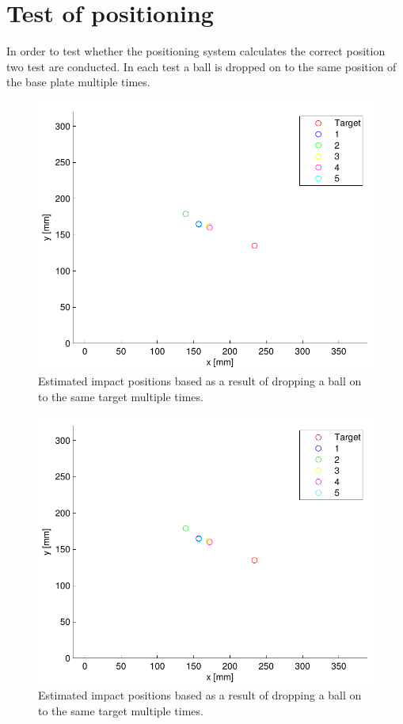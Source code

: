 \section{Test of positioning}
\label{test}
In order to test whether the positioning system calculates the correct position two test are conducted.
In each test a ball is dropped on to the same position of the base plate multiple times.

\begin{figure}[htb]
	\centering
	\includegraphics[width=.8\textwidth]{figures/testRes30deg.pdf}
	\caption{Estimated impact positions based as a result of dropping a ball on to the same target multiple times.}
	\label{fig:testRes30deg}
\end{figure}

\begin{figure}[htb]
	\centering
	\includegraphics[width=.8\textwidth]{figures/testRes15deg.pdf}
	\caption{Estimated impact positions based as a result of dropping a ball on to the same target multiple times.}
	\label{fig:testRes15deg}
\end{figure}
